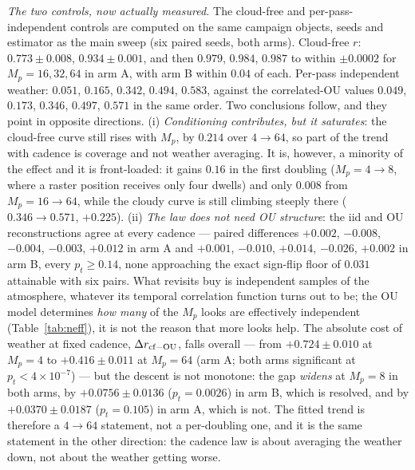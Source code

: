 \documentclass[twocolumn,10pt]{article}
\begin{document}
\emph{The two controls, now actually measured.} The cloud-free and
per-pass-independent controls are computed on the same campaign objects, seeds
and estimator as the main sweep (six paired seeds, both arms). Cloud-free $r$:
$0.773\pm0.008$, $0.934\pm0.001$, and then $0.979$, $0.984$, $0.987$ to within
$\pm0.0002$ for $M_p=16,32,64$ in arm A, with arm B within $0.04$ of each.
Per-pass independent weather: $0.051$, $0.165$, $0.342$, $0.494$, $0.583$,
against the correlated-OU values $0.049$, $0.173$, $0.346$, $0.497$, $0.571$ in
the same order. Two conclusions follow, and they point in opposite directions.
(i) \emph{Conditioning contributes, but it saturates}: the cloud-free curve
still rises with $M_p$, by $0.214$ over $4\to64$, so part of the trend with
cadence is coverage and not weather averaging. It is, however, a minority of the effect and
it is front-loaded: it gains $0.16$ in the first doubling ($M_p=4\to8$, where a
raster position receives only four dwells) and only $0.008$ from $M_p=16\to64$,
while the cloudy curve is still climbing steeply there ($0.346\to0.571$,
$+0.225$). (ii) \emph{The law does not need OU structure}: the iid and OU
reconstructions agree at every cadence --- paired differences $+0.002$, $-0.008$,
$-0.004$, $-0.003$, $+0.012$ in arm A and $+0.001$, $-0.010$, $+0.014$, $-0.026$,
$+0.002$ in arm B, every $p_t\ge0.14$, none approaching the exact sign-flip
floor of $0.031$ attainable with six pairs. What revisits buy is independent
samples of the atmosphere, whatever its temporal correlation function turns out
to be; the OU model determines \emph{how many} of the $M_p$ looks are effectively
independent (Table~\ref{tab:neff}), it is not the reason that more looks help.
The absolute cost of weather at fixed cadence, $\Delta r_{\rm cf-OU}$, falls
overall --- from $+0.724\pm0.010$ at $M_p=4$ to $+0.416\pm0.011$ at $M_p=64$
(arm A; both arms significant at $p_t<4\times10^{-7}$) --- but the descent is not
monotone: the gap \emph{widens} at $M_p=8$ in both arms, by $+0.0756\pm0.0136$
($p_t=0.0026$) in arm B, which is resolved, and by $+0.0370\pm0.0187$
($p_t=0.105$) in arm A, which is not. The fitted trend is therefore a
$4\to64$ statement, not a per-doubling one, and it is the same
statement in the other direction: the cadence law is about averaging the weather
down, not about the weather getting worse.
\end{document}
